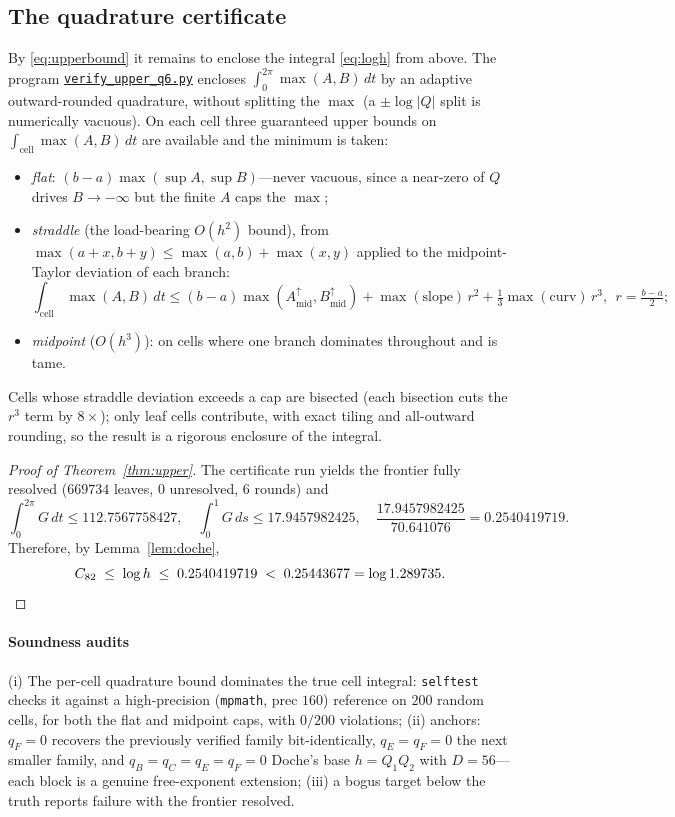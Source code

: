 \documentclass[11pt,reqno]{amsart}
\theoremstyle{plain}
\theoremstyle{definition}
\newcommand{\Cee}{C_{82}}
\newcommand{\repofile}[1]{\href{https://github.com/tempcollab/optimizationproblems/blob/main/constants/82a/certificate/#1}{\texttt{#1}}}
\begin{document}
\subsection{The quadrature certificate}
By \eqref{eq:upperbound} it remains to enclose the integral \eqref{eq:logh} from
above. The program \repofile{verify\_upper\_q6.py} encloses
$\int_0^{2\pi}\max(A,B)\,dt$ by an adaptive outward-rounded quadrature, without
splitting the $\max$ (a $\pm\log|Q|$ split is numerically vacuous). On each cell
three guaranteed upper bounds on $\int_{\text{cell}}\max(A,B)\,dt$ are available
and the minimum is taken:
\begin{itemize}
\item \emph{flat}: $(b-a)\max(\sup A,\sup B)$---never vacuous, since a near-zero of
  $Q$ drives $B\to-\infty$ but the finite $A$ caps the $\max$;
\item \emph{straddle} (the load-bearing $O(h^2)$ bound), from
  $\max(a+x,b+y)\le\max(a,b)+\max(x,y)$ applied to the midpoint-Taylor deviation of
  each branch:
  \[
    \int_{\text{cell}}\!\max(A,B)\,dt\le
    (b-a)\max(A^\uparrow_{\mathrm{mid}},B^\uparrow_{\mathrm{mid}})
    +\max(\text{slope})\,r^2+\tfrac13\max(\text{curv})\,r^3,\ \ r=\tfrac{b-a}2;
  \]
\item \emph{midpoint} ($O(h^3)$): on cells where one branch dominates throughout
  and is tame.
\end{itemize}
Cells whose straddle deviation exceeds a cap are bisected (each bisection cuts the
$r^3$ term by $8\times$); only leaf cells contribute, with exact tiling and
all-outward rounding, so the result is a rigorous enclosure of the integral.

\begin{proof}[Proof of Theorem~\ref{thm:upper}]
The certificate run yields the frontier fully resolved ($669734$ leaves, $0$
unresolved, $6$ rounds) and
\[
  \int_0^{2\pi}G\,dt\le112.7567758427,\quad
  \int_0^1 G\,ds\le17.9457982425,\quad
  \frac{17.9457982425}{70.641076}=0.2540419719 .
\]
Therefore, by Lemma~\ref{lem:doche},
\[
  \Cee\;\le\;\log h\;\le\;0.2540419719\;<\;0.25443677=\log1.289735. \qedhere
\]
\end{proof}

\paragraph{Soundness audits}
(i) The per-cell quadrature bound dominates the true cell integral:
\texttt{selftest} checks it against a high-precision (\texttt{mpmath}, prec $160$)
reference on $200$ random cells, for both the flat and midpoint caps, with
$0/200$ violations;
(ii) anchors: $q_F=0$ recovers the previously verified family bit-identically,
$q_E=q_F=0$ the next smaller family, and $q_B=q_C=q_E=q_F=0$ Doche's base
$h=Q_1Q_2$ with $D=56$---each block is a genuine free-exponent extension;
(iii) a bogus target below the truth reports failure with the frontier resolved.
\end{document}
